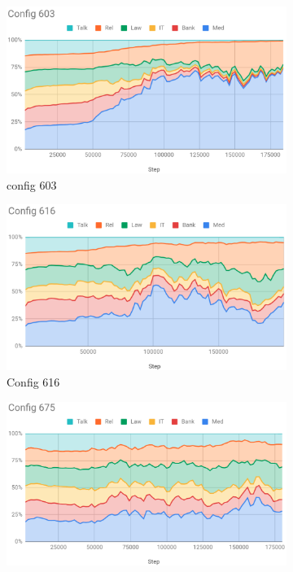 \documentclass[11pt,a4paper]{article}
\begin{document}
\begin{figure}[htb]
\begin{subfigure}{.5\textwidth}
  \centering
  \includegraphics[width=.8\linewidth]{config603.png}  
  \caption{config 603}
  \label{fig:603}
\end{subfigure}
\begin{subfigure}{.5\textwidth}
  \centering
  \includegraphics[width=.8\linewidth]{config616.png}  
  \caption{Config 616}
  \label{fig:616}
\end{subfigure}
\newline
\begin{subfigure}{.5\textwidth}
  \centering
  \includegraphics[width=.8\linewidth]{config675.png}  

\end{subfigure}
\end{figure}
\end{document}
